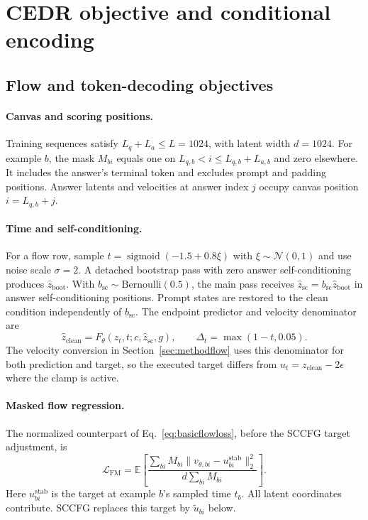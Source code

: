 \documentclass[11pt,letterpaper]{article}
\newcommand{\E}{\mathbb{E}}
\begin{document}
\section{CEDR objective and conditional encoding}
\label{app:methodobjective}

\subsection{Flow and token-decoding objectives}

\paragraph{Canvas and scoring positions.}
Training sequences satisfy $L_q+L_a\le L=1024$, with latent width $d=1024$. For example $b$, the mask $M_{bi}$ equals one on $L_{q,b}<i\le L_{q,b}+L_{a,b}$ and zero elsewhere. It includes the answer's terminal token and excludes prompt and padding positions. Answer latents and velocities at answer index $j$ occupy canvas position $i=L_{q,b}+j$.

\paragraph{Time and self-conditioning.}
For a flow row, sample $t=\operatorname{sigmoid}(-1.5+0.8\xi)$ with $\xi\sim\mathcal N(0,1)$ and use noise scale $\sigma=2$. A detached bootstrap pass with zero answer self-conditioning produces $\widehat z_{\mathrm{boot}}$. With $b_{\mathrm{sc}}\sim\mathrm{Bernoulli}(0.5)$, the main pass receives $\widehat z_{\mathrm{sc}}=b_{\mathrm{sc}}\widehat z_{\mathrm{boot}}$ in answer self-conditioning positions. Prompt states are restored to the clean condition independently of $b_{\mathrm{sc}}$. The endpoint predictor and velocity denominator are
\begin{equation}
 \widehat z_{\mathrm{clean}}=F_\theta(z_t,t;c,\widehat z_{\mathrm{sc}},g),
 \qquad \Delta_t=\max(1-t,0.05).
 \label{eq:methodendpoint}
\end{equation}
The velocity conversion in Section~\ref{sec:methodflow} uses this denominator for both prediction and target, so the executed target differs from $u_t=z_{\mathrm{clean}}-2\epsilon$ where the clamp is active.

\paragraph{Masked flow regression.}
The normalized counterpart of Eq.~\eqref{eq:basicflowloss}, before the SCCFG target adjustment, is
\begin{equation}
 \mathcal L_{\mathrm{FM}}=
 \E\!\left[\frac{\sum_{bi} M_{bi}\|v_{\theta,bi}-u_{bi}^{\mathrm{stab}}\|_2^2}
 {d\sum_{bi} M_{bi}}\right].
 \label{eq:methodflowloss}
\end{equation}
Here $u_{bi}^{\mathrm{stab}}$ is the target at example $b$'s sampled time $t_b$. All latent coordinates contribute. SCCFG replaces this target by $\widetilde u_{bi}$ below.
\end{document}
